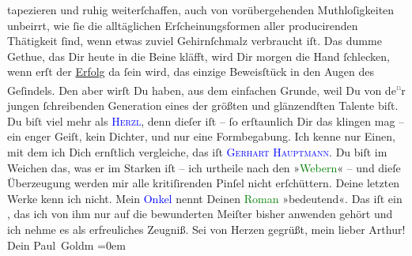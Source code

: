                tapezieren und ruhig weiterſchaffen, auch von vorübergehenden Muthloſigkeiten
               unbeirrt, wie ſie die alltäglichen Erſcheinungsformen aller  producirenden Thätigkeit ſind, wenn etwas zuviel Gehirnſchmalz verbraucht iſt.
               Das dumme Gethue, das Dir heute in die Beine kläfft, wird Dir morgen die Hand
               ſchlecken, wenn erſt der \uline{Erfolg} da ſein wird, das
               einzige Beweisſtück in den Augen des Geſindels. Den aber wirſt Du haben, aus dem
               einfachen Grunde, weil Du von de\substVorne{}\textsuperscript{\textcolor{gray}{n}}\substDazwischen{}r\substHinten{} jungen ſchreibenden {\pb}Generation eines der
               größten und glänzendſten Talente biſt. Du biſt viel mehr als \textsc{\textcolor{blue}{Herzl}{}\ledrightnote{\textcolor{blue}{Theodor Herzl}}}, denn dieſer iſt – ſo erſtaunlich Dir das klingen mag – ein enger Geiſt, kein
               Dichter, und nur eine Formbegabung. Ich kenne nur Einen, mit dem ich Dich ernſtlich
               vergleiche, das iſt \textsc{\textcolor{blue}{Gerhart Hauptmann}{}\ledrightnote{\textcolor{blue}{Gerhart Hauptmann}}}. Du biſt im Weichen das, was er im Starken iſt – ich urtheile nach den »\textcolor{green}{Webern}{}\ledrightnote{\textcolor{green}{Die Weber}}« – und dieſe Überzeugung werden mir alle
               kritiſirenden Pinſel nicht erſchüttern. Deine letzten Werke kenn ich nicht. Mein \textcolor{blue}{Onkel}{} nennt Deinen \textcolor{green}{Roman}{} »bedeutend«. Das iſt ein
                  \label{K_L02711-6v}\label{K_L02711-6h}, das ich von ihm nur auf die bewunderten Meiſter bisher anwenden
               gehört und ich nehme es als erfreuliches Zeugniß.\pend
           \pstart
           Sei von Herzen gegrüßt, mein lieber Arthur!{\\[\baselineskip]}Dein \spacefill\mbox{Paul Goldm}\pend
           \leftskip=0em{}\endnumbering{}  
      